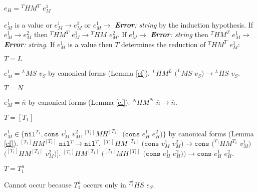 \begin{case}

$e_{H}={^{T}H}M^{T}$ $e_{M}^{1}$

$e_{M}^{1}$ is a value or $e_{M}^{1}\rightarrow e_{M}^{2}$ or $e_{M}^{1}\rightarrow$ \emph{\textbf{Error}: string} by the induction hypothesis.  If $e_{M}^{1}\rightarrow e_{M}^{2}$ then $^{T}HM^{T}$ $e_{M}^{1}\rightarrow{^{T}H}M$ $e_{M}^{2}$.  If $e_{M}^{1}\rightarrow$ \emph{\textbf{Error}: string} then $^{T}HM^{T}$ $e_{M}^{1}\rightarrow$ \emph{\textbf{Error}: string}.  If $e_{M}^{1}$ is a value then $T$ determines the reduction of $^{T}HM^{T}$ $e_{M}^{1}$:

\begin{subcase}

$T=L$

$e_{M}^{1}={^{L}M}S$ $v_{S}$ by canonical forms (Lemma \ref{cf}).  $^{L}HM^{L}$ $(^{L}MS$ $v_{S})\rightarrow{^{L}H}S$ $v_{S}$.

\end{subcase}

\begin{subcase}

$T=N$

$e_{M}^{1}=\overline{n}$ by canonical forms (Lemma \ref{cf}).  $^{N}HM^{N}$ $\overline{n}\rightarrow\overline{n}$.

\end{subcase}

\begin{subcase}

$T=[T_{1}]$

$e_{M}^{1}\in\lbrace\mathtt{nil}^{T_{1}},\mathtt{cons}$ $v_{M}^{1}$ $v_{M}^{2},{^{[T_{1}]}M}H^{[T_{1}]}$ $(\mathtt{cons}$ $e_{H}^{1}$ $e_{H}^{2})\rbrace$ by canonical forms (Lemma \ref{cf}).  $^{[T_{1}]}HM^{[T_{1}]}$ $\mathtt{nil}^{T}\rightarrow\mathtt{nil}^{T}$.  $^{[T_{1}]}HM^{[T_{1}]}$ $(\mathtt{cons}$ $v_{M}^{1}$ $v_{M}^{2})\rightarrow\mathtt{cons}$ $(^{T_{1}}HM^{T_{1}}$ $v_{M}^{1})$ $(^{[T_{1}]}HM^{[T_{1}]}$ $v_{M}^{2})]$.  $^{[T_{1}]}HM^{[T_{1}]}$ $(^{[T_{1}]}MH^{[T_{1}]}$ $(\mathtt{cons}$ $e_{H}^{1}$ $e_{H}^{2}))\rightarrow\mathtt{cons}$ $e_{H}^{1}$ $e_{H}^{2}$.

\end{subcase}

\begin{subcase}

$T=T_{1}^{a}$

Cannot occur because $T_{1}^{a}$ occurs only in $^{T_{1}^{a}}HS$ $e_{S}$.


\end{subcase}
\end{case}
